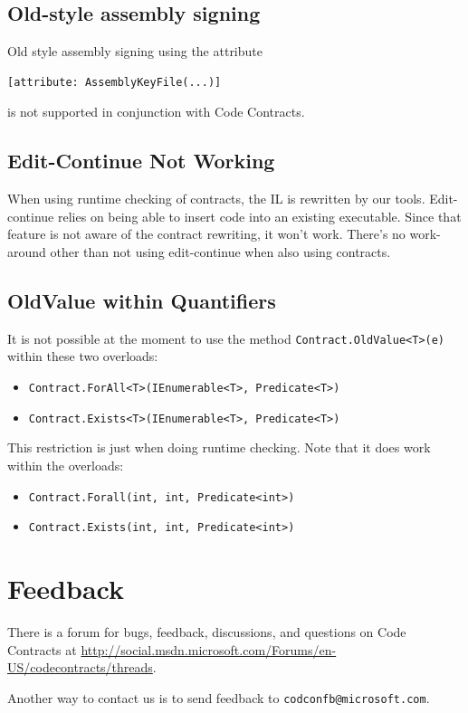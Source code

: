 \documentclass{article}
\newcommand{\code}[1]{\lstinline{#1}}
\begin{document}
\subsection{Old-style assembly signing}
Old style assembly signing using the attribute
\begin{lstlisting}
[attribute: AssemblyKeyFile(...)]
\end{lstlisting}
is not supported in conjunction with Code Contracts. 

\subsection{Edit-Continue Not Working}
When using runtime checking of contracts, the IL is rewritten by our
tools. Edit-continue relies on being able to insert code into an
existing executable. Since that feature is not aware of the contract
rewriting, it won't work. There's no work-around other than not using
edit-continue when also using contracts.

\subsection{OldValue within Quantifiers}
It is not possible at the moment to use the method
\code{Contract.OldValue<T>(e)} within these two overloads:
\begin{itemize}
  \item \code{Contract.ForAll<T>(IEnumerable<T>, Predicate<T>)}
  \item \code{Contract.Exists<T>(IEnumerable<T>, Predicate<T>)}
\end{itemize}
This restriction is just when doing runtime checking.
Note that it does work within the overloads:
\begin{itemize}
  \item \code{Contract.Forall(int, int, Predicate<int>)}
  \item \code{Contract.Exists(int, int, Predicate<int>)}
\end{itemize}

\section{Feedback}

There is a forum for bugs, feedback, discussions, and questions on Code
Contracts at \url{http://social.msdn.microsoft.com/Forums/en-US/codecontracts/threads}.

Another way to contact us is to send feedback to \verb|codconfb@microsoft.com|.
\end{document}
